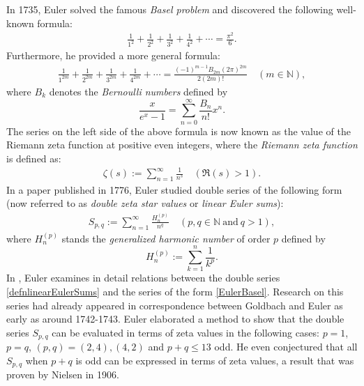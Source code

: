 \documentclass[11pt]{article}
\def\N{\mathbb{N}}
\theoremstyle{plain}
\theoremstyle{definition}
\begin{document}
In 1735, Euler solved the famous \emph{Basel problem} and discovered the following well-known formula:
\begin{align}\label{Baselquestion}
\frac1{1^2}+\frac{1}{2^2}+\frac1{3^2}+\frac1{4^2}+\cdots=\frac{\pi^2}{6}.
\end{align}
Furthermore, he provided a more general formula:
\begin{align}\label{EulerBasel}
\frac1{1^{2m}}+\frac{1}{2^{2m}}+\frac1{3^{2m}}+\frac1{4^{2m}}+\cdots=\frac{(-1)^{m-1}B_{2m}(2\pi)^{2m}}{2(2m)!}\quad (m\in \N),
\end{align}
where $B_k$ denotes the \emph{Bernoulli numbers} defined by
\[\frac{x}{e^x-1}=\sum_{n=0}^{\infty}{\frac{B_n}{n!}x^n}.\]
The series on the left side of the above formula is now known as the value of the Riemann zeta function at positive even integers, where the \emph{Riemann zeta function} is defined as:
\begin{align}\label{defnRiemannzeta}
\zeta(s):=\sum_{n=1}^\infty \frac1{n^s}\quad (\Re(s)>1).
\end{align}
In a paper published in 1776, Euler \cite{Berndt1985,Euler1776} studied double series of the following form (now referred to as \emph{double zeta star values} or \emph{linear Euler sums}):
\begin{align}\label{defnlinearEulerSums}
S_{p,q}:=\sum_{n=1}^\infty \frac{H_n^{(p)}}{n^q}\quad (p,q\in \N\ \text{and}\ q>1),
\end{align}
where $H_n^{(p)}$ stands the {\emph{generalized harmonic number}} of order $p$ defined by
\[H_n^{(p)}:=\sum_{k=1}^n \frac{1}{k^p}.\]
In \cite{Euler1776}, Euler examines in detail relations
between the double series \eqref{defnlinearEulerSums} and the series of the form \eqref{EulerBasel}. Research on this series had already appeared in correspondence between Goldbach and Euler as early as around 1742-1743. Euler elaborated a method to show that the double series $S_{p,q}$ can be evaluated in terms of zeta values in the following cases: $p=1$, $p=q$, $(p,q)=(2,4),(4,2)$ and $p+q\leq 13$ odd. He even conjectured that all $S_{p,q}$ when $p+q$ is odd can be expressed in terms of zeta values, a result that was proven by Nielsen \cite{Nielsen1906} in 1906.
\end{document}
